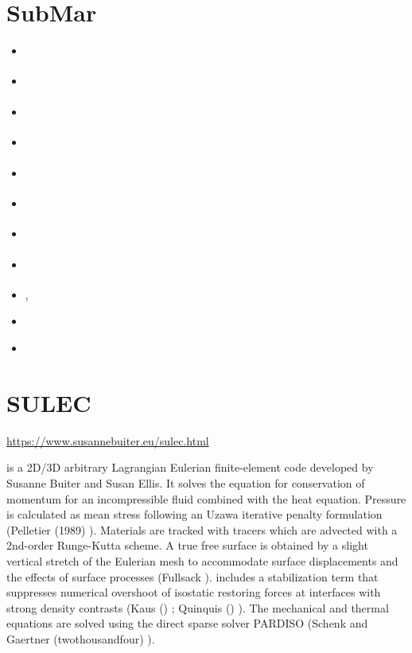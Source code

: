 \section{SubMar} 

\begin{small}
\begin{itemize}
\item[\twothousandsix]       \textcite{masr06}
\item[\twothousandseven]     \textcite{masp07}
\item[\twothousandten]       \textcite{roms10}
\item[\twothousandtwelve]    \textcite{rosm12}
\item[\twothousandthirteen]  \textcite{rems13}
\item[\twothousandseventeen] \textcite{rerm17}
\item[\twothousandeighteen]  \textcite{marc18}
\item[\twothousandnineteen]  \textcite{rors19}
\item[\twothousandtwenty]    \textcite{rozr20}, \textcite{relr20}
\item[\twothousandtwentyone] \textcite{resr21}
\item[\twothousandtwentytwo] \textcite{bors22}
\end{itemize}
\end{small}

\section{SULEC}

\url{https://www.susannebuiter.eu/sulec.html}

\sulec is a 2D/3D arbitrary Lagrangian Eulerian finite-element 
code developed by Susanne Buiter and Susan Ellis. 
It solves the equation for conservation of momentum for an incompressible fluid combined with 
the heat equation. Pressure is calculated as mean stress following an Uzawa iterative penalty 
formulation (Pelletier \etal (1989) \cite{pefc89}). 
Materials are tracked with tracers which are advected with a 2nd-order Runge-Kutta scheme. 
A true free surface is obtained by a slight vertical stretch of the Eulerian mesh to 
accommodate surface displacements and the effects of surface processes (Fullsack \nineteenninetyfive \cite{full95}). 
\sulec includes a stabilization term that suppresses numerical overshoot of isostatic restoring forces 
at interfaces with strong density contrasts (Kaus \etal (\twothousandten) \cite{kamm10}; 
Quinquis \etal (\twothousandeleven) \cite{qube11}). The mechanical and thermal equations are solved using 
the direct sparse solver PARDISO (Schenk and Gaertner (twothousandfour) \cite{scga04}).


